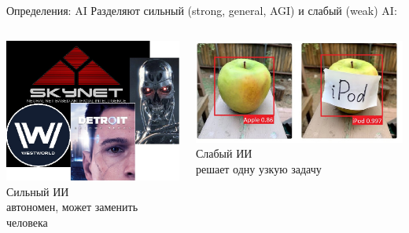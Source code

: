 \documentclass[aspectratio=169, professionalfonts]{beamer}
\begin{document}
\begin{frame}{Определения: AI}
    Разделяют сильный (strong, general, AGI) и слабый (weak) AI:
    \begin{columns}
        \begin{column}{.35\linewidth}
            \centering
            \includegraphics[width=\linewidth]{figures/fig4-strong-ai.jpg}
            Сильный ИИ \\
            \footnotesize{автономен, может заменить человека}
        \end{column}
        \begin{column}{.35\linewidth}
            \centering
            \includegraphics[width=\linewidth]{figures/fig5-weak-ai.jpg}
            Слабый ИИ \\
            \footnotesize{решает одну узкую задачу}
        \end{column}
    \end{columns}
\end{frame}
\end{document}
